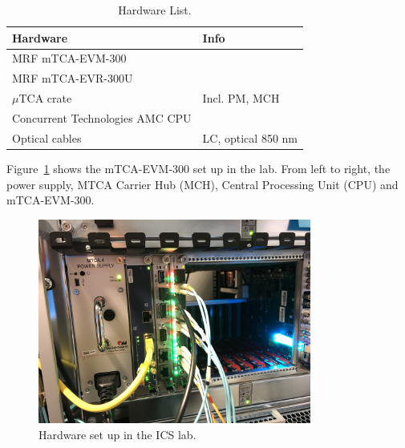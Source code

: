 \documentclass[11pt
  , a4paper
  , article
  , oneside
  , showtrims
]{memoir}
\begin{document}
\begin{table}[!hb]
  \centering
  \begin{tabular}{l|l}
    \toprule
    Hardware                        & Info                            \\\midrule
    MRF mTCA-EVM-300                &                                 \\\midrule
    MRF mTCA-EVR-300U               &                                 \\\midrule
    $\mu$TCA crate                  & Incl. PM, MCH                   \\\midrule
    Concurrent Technologies AMC CPU &                                 \\\midrule
    Optical cables                  & LC, optical 850 nm              \\\bottomrule
  \end{tabular}
  \caption[]{Hardware List.}
  \label{table:hwlist}
\end{table}

Figure~\ref{fig:evm-hw-setup} shows the mTCA-EVM-300 set up in the lab. From left to right, the power supply, MTCA Carrier Hub (MCH), Central Processing Unit (CPU) and mTCA-EVM-300.\\

\begin{figure}[!b]
  \centering
  \includegraphics[width=0.8\textwidth]{./pictures/evm-hw-setup.jpg}
  \caption{Hardware set up in the ICS lab.}
  \label{fig:evm-hw-setup}
\end{figure}


\end{document}
